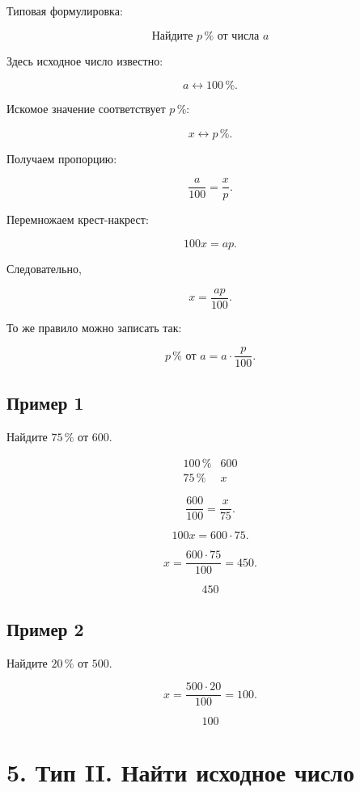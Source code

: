 \documentclass[a4paper,12pt]{article}
\newcommand{\pct}[1]{#1\,\%}
\begin{document}
Типовая формулировка:

\[
\boxed{\text{Найдите }\pct{p}\text{ от числа }a}
\]

Здесь исходное число известно:

\[
a \longleftrightarrow \pct{100}.
\]

Искомое значение соответствует \(\pct{p}\):

\[
x \longleftrightarrow \pct{p}.
\]

Получаем пропорцию:

\[
\frac{a}{100}=\frac{x}{p}.
\]

Перемножаем крест-накрест:

\[
100x=ap.
\]

Следовательно,

\[
\boxed{x=\frac{ap}{100}}.
\]

То же правило можно записать так:

\[
\boxed{\pct{p}\text{ от }a
=
a\cdot\frac{p}{100}}.
\]

\subsection*{Пример 1}

Найдите \(\pct{75}\) от \(600\).

\[
\begin{array}{c|c}
\pct{100} & 600\\
\pct{75} & x
\end{array}
\]

\[
\frac{600}{100}=\frac{x}{75}.
\]

\[
100x=600\cdot75.
\]

\[
x=\frac{600\cdot75}{100}=450.
\]

\[
\boxed{450}
\]

\subsection*{Пример 2}

Найдите \(\pct{20}\) от \(500\).

\[
x=\frac{500\cdot20}{100}=100.
\]

\[
\boxed{100}
\]


\section*{\textcolor{darkaccent}{5. Тип II. Найти исходное число}}
\end{document}
